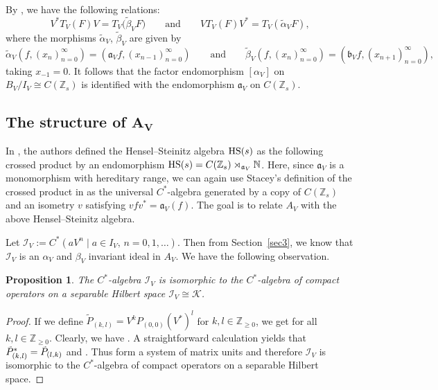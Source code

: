 \documentclass[pdftex]{sigma}
\newcommand{\N}{{\mathbb N}}
\newcommand{\Z}{{\mathbb Z}}
\numberwithin{equation}{section}
\newtheorem{Proposition}[Theorem]{Proposition}
 { \theoremstyle{definition}
\newtheorem{Definition}[Theorem]{Definition}
\newtheorem{Note}[Theorem]{Note}
\newtheorem{Example}[Theorem]{Example}
\newtheorem{Remark}[Theorem]{Remark} }
\begin{document}
By \cite[equation (5.2)]{HKMP3}, we have the following relations:
\begin{equation*}
V^*T_V(F)V=T_V\bigl(\tilde{\beta}_VF\bigr)\qquad\text{and}\qquad VT_V(F)V^*=T_V(\tilde{\alpha}_VF) ,
\end{equation*}
where the morphisms $\tilde{\alpha}_V$, $\tilde{\beta}_V$ are given by
\begin{equation*}
\tilde{\alpha}_V(f,(x_n)_{n=0}^\infty)= (\mathfrak{a}_V f,(x_{n-1})_{n=0}^\infty)\qquad\text{and}\qquad \tilde{\beta}_V(f,(x_n)_{n=0}^\infty) = (\mathfrak{b}_V f,(x_{n+1})_{n=0}^\infty),
\end{equation*}
taking $x_{-1}=0$.
It follows that the factor endomorphism $[\alpha_V]$ on $B_V/I_V\cong C(\Z_s)$ is identified with the endomorphism $\mathfrak{a}_V$ on $C(\Z_s)$.

\subsection[The structure of A\_V]{The structure of $\boldsymbol{A_V}$}

In \cite{HKMP2}, the authors defined the Hensel--Steinitz algebra ${\rm HS}(s)$ as the following crossed product by an endomorphism
${\rm HS}(s) = C(\Z_s)\rtimes_{\mathfrak{a}_V}\N$.
Here, since $\mathfrak{a}_V$ is a monomorphism with hereditary range, we can again use Stacey's definition of the crossed product in \cite{St} as the universal $C^*$-algebra generated by a copy of $C(\Z_s)$ and an isometry $v$ satisfying
$vfv^*=\mathfrak{a}_V(f)$. The goal is to relate $A_V$ with the above Hensel--Steinitz algebra.

Let $\mathcal{I}_V := C^*(aV^n \mid a\in I_V,\, n=0,1,\dots)$. Then from Section~\ref{sec3}, we know that $\mathcal{I}_V$ is an $\alpha_V$ and $\beta_V$ invariant ideal in $A_V$.
We have the following observation.

\begin{Proposition}\label{IVStructure}
The $C^*$-algebra $\mathcal{I}_V$ is isomorphic to the $C^*$-algebra of compact operators on a separable Hilbert space
$
\mathcal{I}_V\cong\mathcal{K}$.
\end{Proposition}
\begin{proof}
If we define
$\tilde P_{(k,l)} = V^kP_{(0,0)}(V^*)^{l}$ for $k,l\in\Z_{\ge0}$,
we get  for all ${k,l\in\Z_{\ge0}}$. Clearly, we have
\smash{$\mathcal{I}_V=C^*\bigl(\tilde P_{(k,l)}\mid k,l\in\Z_{\ge0}\bigr)$}.
A straightforward calculation yields that
$
\smash{\tilde P_{(k,l)}^*}=\smash{\tilde P_{(l,k)}}$ and .
Thus \smash{$\{\tilde P_{(k,l)}\}_{k,l\in\Z_{\ge0}}$} form a system of matrix units and therefore $\mathcal{I}_V$ is isomorphic to the $C^*$-algebra of compact operators on a separable Hilbert space.
\end{proof}
\end{document}
